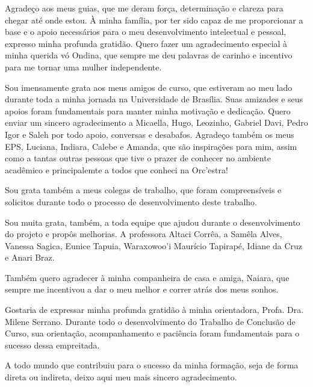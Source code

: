 \begin{agradecimentos}
    Agradeço aos meus guias, que me deram força, determinação e clareza para chegar até onde estou. À minha família, por ter sido capaz de me proporcionar a base e o apoio necessários para o meu desenvolvimento intelectual e pessoal, expresso minha profunda gratidão. Quero fazer um agradecimento especial à minha querida vó Ondina, que sempre me deu palavras de carinho e incentivo para me tornar uma mulher independente.

    Sou imensamente grata aos meus amigos de curso, que estiveram ao meu lado durante toda a minha jornada na Universidade de Brasília. Suas amizades e seus apoios foram fundamentais para manter minha motivação e dedicação. Quero enviar um sincero agradecimento a Micaella, Hugo, Leozinho, Gabriel Davi, Pedro Igor e Saleh por todo apoio, conversas e desabafos. Agradeço também os meus EPS, Luciana, Indiara, Calebe e Amanda, que são inspirações para mim, assim como a tantas outras pessoas que tive o prazer de conhecer no ambiente acadêmico 
    e principalemte a todos que conheci na Orc'estra!

    Sou grata também a meus colegas de trabalho, que foram compreensíveis e solicitos durante todo o processo de desenvolvimento deste trabalho.
    
    Sou muita grata, também, a toda equipe que ajudou durante o desenvolvimento do projeto e propôs melhorias. A professora Altaci Corrêa, a Samêla Alves, Vanessa Sagica, Eunice Tapuia, Waraxowoo'i Maurício Tapirapé, Idiane da Cruz e Anari Braz.

    Também quero agradecer à minha companheira de casa e amiga, Naiara, que sempre me incentivou a dar o meu melhor e correr atrás dos meus sonhos.
    
    Gostaria de expressar minha profunda gratidão à minha orientadora, Profa. Dra. Milene Serrano. Durante todo o desenvolvimento do Trabalho de Conclusão de Curso, sua orientação, acompanhamento e paciência foram fundamentais para o sucesso dessa empreitada.
    
    A todo mundo que contribuiu para o sucesso da minha formação, seja de forma direta ou indireta, deixo aqui meu mais sincero agradecimento.
\end{agradecimentos}
